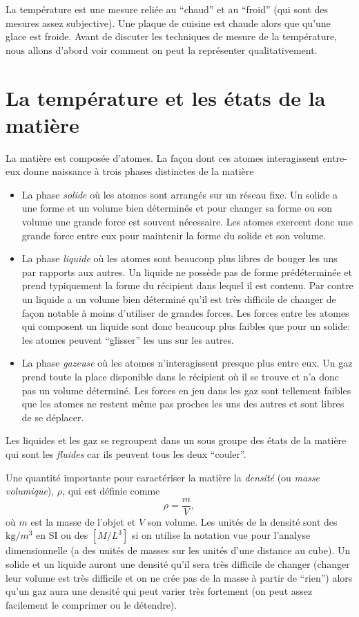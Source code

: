 \documentclass[a4paper,12pt]{book}
\newcommand{\kg}{\mathrm{kg}}
\begin{document}
La température est une mesure reliée au ``chaud'' et au ``froid'' (qui sont des mesures assez subjective). Une plaque de cuisine est chaude alors que 
qu'une glace est froide. Avant de discuter les techniques de mesure de la température, nous allons d'abord voir comment on peut la représenter qualitativement.

\section{La température et les états de la matière}

La matière est composée d'atomes. La façon dont ces atomes interagissent entre-eux donne naissance à
trois phases distinctes de la matière
\begin{itemize}
 \item La phase \textit{solide} où les atomes sont arrangés sur un réseau fixe. Un solide a une forme et un volume bien déterminés et pour
 changer sa forme ou son volume une grande force est souvent nécessaire. Les atomes exercent donc une grande force entre eux pour maintenir 
 la forme du solide et son volume.
 \item La phase \textit{liquide} où les atomes sont beaucoup plus libres de bouger les uns par rapports aux autres. Un liquide ne possède pas
 de forme prédéterminée et prend typiquement la forme du récipient dans lequel il est contenu. Par contre un liquide a un volume bien déterminé
 qu'il est très difficile de changer de façon notable à moins d'utiliser de grandes forces. 
 Les forces entre les atomes qui composent un liquide sont donc beaucoup
 plus faibles que pour un solide: les atomes peuvent ``glisser'' les uns sur les autres.
 \item La phase \textit{gazeuse} où les atomes n’interagissent presque plus entre eux. Un gaz prend toute la place disponible dans le récipient où il se trouve
 et n'a donc pas un volume déterminé. Les forces en jeu dans les gaz sont tellement faibles que les atomes ne restent même pas proches les uns
 des autres et sont libres de se déplacer.
\end{itemize}
Les liquides et les gaz se regroupent dans un sous groupe des états de la matière qui sont les \textit{fluides} car ils peuvent tous les deux ``couler''.

Une quantité importante pour caractériser la matière la \textit{densité} (ou \textit{masse volumique}), $\rho$, qui est définie comme
\begin{equation}
 \rho=\frac{m}{V},
\end{equation}
où $m$ est la masse de l'objet et $V$ son volume. Les unités de la densité sont des $\kg/m^3$ en SI ou des $[M/L^3]$ si on utilise la notation vue pour 
l'analyse dimensionnelle (a des unités de masses sur les unités d'une distance au cube). 
Un solide et un liquide auront une densité qu'il sera très difficile de changer (changer leur volume est
très difficile et on ne crée pas de la masse à partir de ``rien'') 
alors qu'un gaz aura une densité qui peut varier très fortement (on peut assez facilement le comprimer ou le détendre).
\end{document}
